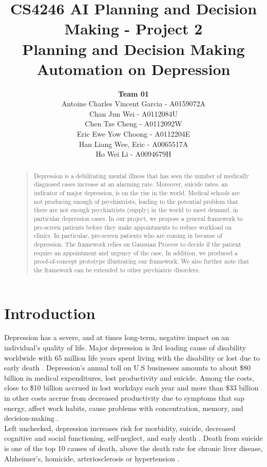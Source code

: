 \documentclass{article}
\title{
	CS4246 AI Planning and Decision Making - Project 2 \\
	Planning and Decision Making Automation on Depression
}
\author{
	{\bf Team 01} \\
	Antoine Charles Vincent Garcia - A0159072A\\
	Chan Jun Wei - A0112084U\\
	Chen Tze Cheng - A0112092W\\
	Eric Ewe Yow Choong - A0112204E\\
	Han Liang Wee, Eric - A0065517A\\
	Ho Wei Li - A0094679H\\
}
\begin{document}
 	\maketitle

	\begin{abstract}
	\begin{quote}
	Depression is a debilitating mental illness that has seen the number of medically diagnosed cases increase at an alarming rate. Moreover, suicide rates, an indicator of major depression, is on the rise in the world. Medical schools are not producing enough of psychiatrists, leading to the potential problem that there are not enough psychiatrists (supply) in the world to meet demand, in particular depression cases. In our project, we propose a general framework to pre-screen patients before they make appointments to reduce workload on clinics. In particular, pre-screen patients who are coming in because of depression. The framework relies on Gaussian Process to decide if the patient require an appointment and urgency of the case. In addition, we produced a proof-of-concept prototype illustrating our framework. We also further note that the framework can be extended to other psychiatric disorders.\\
	\end{quote}
	\end{abstract}
	
	\section{Introduction}
	Depression has a severe, and at times long-term, negative impact on an individual's quality of life. 
	Major depression is 3rd leading cause of disability worldwide with 65 million life years spent living with the disability or lost due to early death \cite{who2004}.
	Depression's annual toll on U.S businesses amounts to about \$80 billion in medical expenditures, lost productivity and suicide. 
	Among the costs, close to \$10 billion accrued in lost workdays each year and more than \$33 billion in other costs accrue from decreased productivity due to symptoms that sap energy, affect work habits, cause problems with concentration, memory, and decision-making \cite{tjcp2015}. \\

	Left unchecked, depression increases risk for morbidity, suicide, decreased cognitive and social functioning, self-neglect, and early death \cite{arcp2009}. 
	Death from suicide is one of the top 10 causes of death, above the death rate for chronic liver disease, Alzheimer's, homicide, arteriosclerosis or hypertension \cite{nvsr2016}. \\
\end{document}
